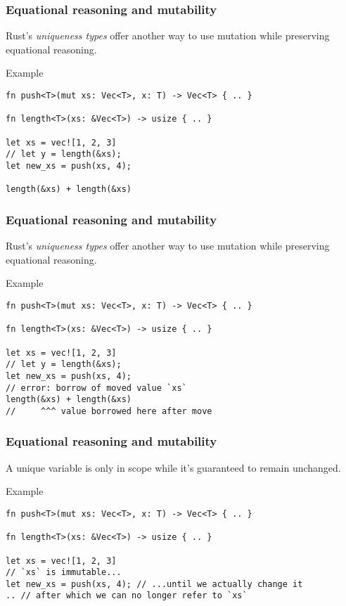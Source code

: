 \documentclass[t]{beamer}
\begin{document}
\begin{frame}[fragile]
\frametitle{Equational reasoning and mutability}
Rust's \emph{uniqueness types} offer another way to use mutation while
preserving equational reasoning.

\begin{block}{Example}
\begin{verbatim}
fn push<T>(mut xs: Vec<T>, x: T) -> Vec<T> { .. }

fn length<T>(xs: &Vec<T>) -> usize { .. }

let xs = vec![1, 2, 3]
// let y = length(&xs);
let new_xs = push(xs, 4);

length(&xs) + length(&xs)

\end{verbatim}
\end{block}

\end{frame}


\begin{frame}[fragile]
\frametitle{Equational reasoning and mutability}
Rust's \emph{uniqueness types} offer another way to use mutation while
preserving equational reasoning.

\begin{block}{Example}
\begin{verbatim}
fn push<T>(mut xs: Vec<T>, x: T) -> Vec<T> { .. }

fn length<T>(xs: &Vec<T>) -> usize { .. }

let xs = vec![1, 2, 3]
// let y = length(&xs);
let new_xs = push(xs, 4);
// error: borrow of moved value `xs`
length(&xs) + length(&xs)
//     ^^^ value borrowed here after move
\end{verbatim}
\end{block}

\end{frame}


\begin{frame}[fragile]
\frametitle{Equational reasoning and mutability}

A unique variable is only in scope while it's guaranteed to remain unchanged.

\begin{block}{Example}
\begin{verbatim}
fn push<T>(mut xs: Vec<T>, x: T) -> Vec<T> { .. }

fn length<T>(xs: &Vec<T>) -> usize { .. }

let xs = vec![1, 2, 3]
// `xs` is immutable...
let new_xs = push(xs, 4); // ...until we actually change it
.. // after which we can no longer refer to `xs`
\end{verbatim}
\end{block}

\end{frame}
\end{document}
